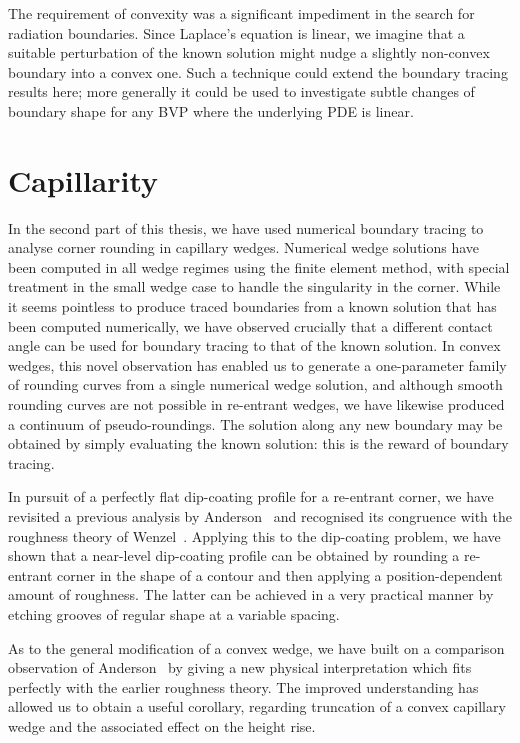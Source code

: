 The requirement of convexity was a significant impediment
in the search for radiation boundaries.
Since Laplace's equation is linear,
we imagine that a suitable perturbation of the known solution
might nudge a slightly non-convex boundary
into a convex one.
Such a technique could extend the boundary tracing results here;
more generally it could be used to investigate
subtle changes of boundary shape
for any BVP where the underlying PDE is linear.

\section{Capillarity}
\label{sec:concluding.capillarity}

In the second part of this thesis,
we have used numerical boundary tracing
to analyse corner rounding in capillary wedges.
Numerical wedge solutions have been computed in all wedge regimes
using the finite element method,
with special treatment in the small wedge case
to handle the singularity in the corner.
While it seems pointless to produce traced boundaries
from a known solution that has been computed numerically,
we have observed crucially that
a different contact angle can be used for boundary tracing
to that of the known solution.
In convex wedges,
this novel observation has enabled us to generate
a one-parameter family of rounding curves
from a single numerical wedge solution,
and although smooth rounding curves
are not possible in re-entrant wedges,
we have likewise produced a continuum of pseudo-roundings.
The solution along any new boundary
may be obtained by simply evaluating the known solution:
this is the reward of boundary tracing.

In pursuit of a perfectly flat dip-coating profile
for a re-entrant corner,
we have revisited a previous analysis
by Anderson~\cite{anderson-2002-thesis-boundary-tracing-pdes}
and recognised its congruence with the roughness theory
of Wenzel~\cite{wenzel-1936-resistance-solid-surfaces-wetting}.
Applying this to the dip-coating problem,
we have shown that
a near-level dip-coating profile can be obtained
by rounding a re-entrant corner in the shape of a contour
and then applying a position-dependent amount of roughness.
The latter can be achieved in a very practical manner
by etching grooves of regular shape at a variable spacing.

As to the general modification of a convex wedge,
we have built on a comparison observation
of Anderson~\cite{anderson-2002-thesis-boundary-tracing-pdes}
by giving a new physical interpretation
which fits perfectly with the earlier roughness theory.
The improved understanding has allowed us to obtain a useful corollary,
regarding truncation of a convex capillary wedge
and the associated effect on the height rise.

